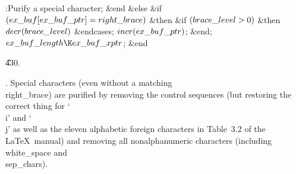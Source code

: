 :Purify a special character\X;\2\2\6
\&{end}\6
\4\&{else} \&{if} $(\\{ex\_buf}[\\{ex\_buf\_ptr}]=\\{right\_brace})$ \1\&{then}%
\6
\&{if} $(\\{brace\_level}>0)$ \1\&{then}\5
$\\{decr}(\\{brace\_level})$\2\2\2\2\6
\&{endcases};\5
$\\{incr}(\\{ex\_buf\_ptr})$;\6
\&{end};\2\6
$\\{ex\_buf\_length}\K\\{ex\_buf\_xptr}$;\6
\&{end}\par
\U430.\fi

.
Special characters (even without a matching \\{right\_brace}) are
purified by removing the control sequences (but restoring the correct
thing for `\.{\\i}' and `\.{\\j}' as well as the eleven alphabetic
foreign characters in Table~3.2 of the \LaTeX\ manual) and removing
all nonalphanumeric characters (including \\{white\_space} and
\\{sep\_char}s).

